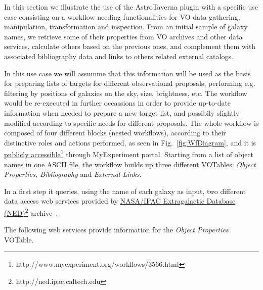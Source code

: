 \documentclass{aa}
\begin{document}
In this section we illustrate the use of the AstroTaverna plugin with a specific use case consisting on a workflow needing functionalities for VO data gathering, manipulation, transformation and inspection. From an initial sample of galaxy names, we retrieve some of their properties from VO archives and other data services, calculate others based on the previous ones, and complement them with associated bibliography data and links to others related external catalogs.

In this use case we will assumme that this information will be used as the basis for preparing lists of targets for different observational proposals, performing e.g. filtering by positions of galaxies on the sky, size, brightness, etc. The workflow would be re-executed in further occassions in order to provide up-to-date information when needed to prepare a new target list, and possibily slightly modified according to specific needs for different proposals. The whole workflow is composed of four different blocks (nested workflows), according to their distinctive roles and actions performed, as seen in Fig.~\ref{fig:WfDiagram}, and it is \href{http://www.myexperiment.org/workflows/3566.html}{publicly accessible}\footnote{http://www.myexperiment.org/workflows/3566.html} through MyExperiment portal. Starting from a list of object names in one ASCII file, the workflow builds up three different VOTables: \textit{Object Properties, Bibliography} and \textit{External Links}.

In a first step it queries, using the name of each galaxy as input, two different data access web services provided by \href{http://ned.ipac.caltech.edu}{NASA/IPAC Extragalactic Database (NED)}\footnote{http://ned.ipac.caltech.edu} archive~\citep{Mazzarella2008}.

The following web services provide information for the \textit{Object Properties} VOTable.
\end{document}
